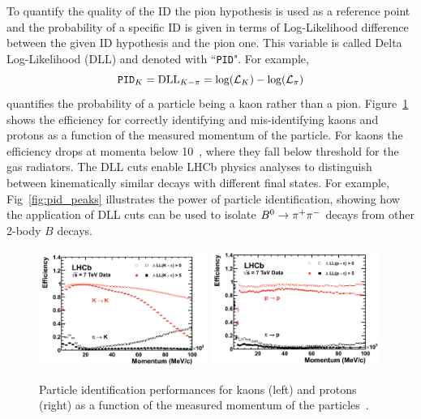 To quantify the quality of the ID the pion hypothesis is used as a reference point and the probability
of a specific ID is given in terms of  Log-Likelihood difference between the given ID hypothesis and the pion one.
This variable is called Delta Log-Likelihood (DLL) and denoted with ``\verb!PID!".
For example,
\begin{equation}
\verb!PID!_K = \text{DLL}_{K-\pi} = \log(\mathcal{L}_K) - \log(\mathcal{L}_\pi)
\end{equation}
quantifies the probability of a particle being a kaon rather than a pion.
Figure~\ref{fig:pid_perf} shows the efficiency for correctly identifying and mis-identifying kaons and protons
as a function of the measured momentum of the particle. For kaons the efficiency drops at momenta below
10~\gev, where they fall below threshold for the gas radiators. 
The DLL cuts enable LHCb physics analyses to distinguish between kinematically similar decays 
with different final states. %
For example, Fig~\ref{fig:pid_peaks} illustrates the power of particle identification,  showing how the application
of DLL cuts can be used to isolate $\Bz\to \pi^+\pi^-$ decays from other 2-body $B$ decays.
%
\begin{figure}[h!]
\centering
\includegraphics[width=0.49\textwidth]{Detector/figs/kaon_pid_perf.png}
\includegraphics[width=0.49\textwidth]{Detector/figs/proton_pid_perf.png}
\caption{Particle identification performances for kaons (left) and protons (right) as a function
of the measured momentum of the particles~\cite{Alves:2008zz}. }
\label{fig:pid_perf}
\end{figure}
